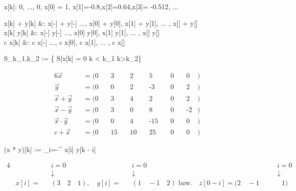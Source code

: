 \documentclass[parskip=half]{scrreprt}
\begin{document}
\begin{abox}
	x[k]: 0, ..., 0, x[0] = 1, x[1]=-0.8,x[2]=0.64,x[3]= -0.512, ...
\end{abox}

\begin{abox}
	x[k] + y[k] &: x[-\infty] + y[-\infty]  ..., x[0] + y[0], x[1] + y[1], ... , x[\infty] + y[\infty]\\
	x[k] \cdot y[k] &: x[-\infty] \cdot y[-\infty]  ..., x[0] \cdot y[0], x[1] \cdot y[1], ... , x[\infty] \cdot y[\infty]\\
	c \cdot x[k] &: c \cdot x[-\infty]  ..., c \cdot x[0], c \cdot x[1], ... , c \cdot x[\infty]\\
\end{abox}

\begin{abox}
	S_{k_1,k_2} := \{ \in S|x[k] = 0 \text{ } \forall k < k_1  k>k_2\}
\end{abox}

\begin{tbox}
	\begin{alignat*}{6}
		\overrightarrow{x} &&= (0 \quad & 3 \quad & 2 \quad & 5 \quad & 0 \quad & 0 &)\\
		\overrightarrow{y} &&= (0 \quad & 0 \quad & 2 \quad & \text{-}3 \quad & 0 \quad & 2 &)\\
		\overrightarrow{x} + \overrightarrow{y} &&= (0 \quad & 3 \quad & 4 \quad & 2 \quad & 0 \quad & 2 &)\\
		\overrightarrow{x} - \overrightarrow{y} &&= ( 0 \quad & 3 \quad & 0 \quad & 8 \quad & 0 \quad & \text{-}2 &)\\
		\overrightarrow{x} \cdot \overrightarrow{y} &&= (0 \quad & 0 \quad & 4 \quad & \text{-}15 \quad & 0 \quad & 0 &)\\
		c + \overrightarrow{x} &&= ( 0 \quad & 15 \quad & 10 \quad & 25 \quad & 0 \quad & 0 &)
	\end{alignat*}
\end{tbox}

\begin{abox}
	(x * y)[k] := \sum_{i=-\infty}^{\infty} x[i] \cdot y[k - i]
\end{abox}

\begin{tbox}
	\begin{alignat*}{4}
		& && i = 0 && i = 0 && i = 0\\
		& && \downarrow && \downarrow && \downarrow\\
		& x[i] = &&(3\quad 2\quad 1), \quad y[i] = &&(1 \quad -1 \quad 2)\text{ bzw.}\quad z[0 - i] = (2 \quad -1 \quad && \text{ } 1)
	\end{alignat*}
\end{tbox}
\end{document}
